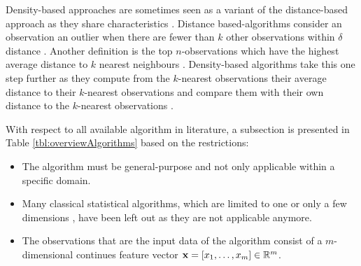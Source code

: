 Density-based approaches are sometimes seen as a variant of the distance-based approach as they share characteristics \cite{Kriegel:2008:AOD:1401890.1401946}. Distance based-algorithms consider an observation an outlier when there are fewer than $k$ other observations within $\delta$ distance  \cite{Knorr:1999:FIK:645925.671529,Knorr:2000:DOA:764212.764218}. Another definition is the top $n$-observations which have the highest average distance to $k$ nearest neighbours \cite{fastoutlier,Eskin02ageometric}. Density-based algorithms take this one step further as they compute from the $k$-nearest observations their average distance to their $k$-nearest observations and compare them with their own distance to the $k$-nearest observations \cite{Schubert:2014:LOD:2560809.2560914}.

With respect to all available algorithm in literature, a subsection is presented in Table \ref{tbl:overviewAlgorithms} based on the restrictions:
\begin{itemize}
  \item The algorithm must be general-purpose and not only applicable within a specific domain.
  \item Many classical statistical algorithms, which are limited to one or only a few dimensions \cite{overviewsurvey}, have been left out as they are not applicable anymore.
  \item The observations that are the input data of the algorithm consist of a $m$-dimensional continues feature vector ${\bf x}=[x_{1},\ldots,x_{m}] \in \mathbb{R}^{m}$.
\end{itemize}

